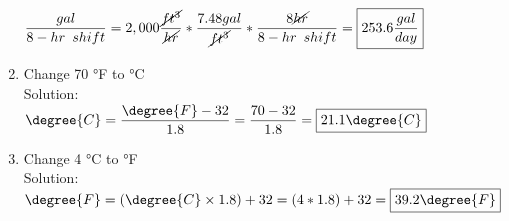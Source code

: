 \documentclass{article}
\begin{document}
\begin{enumerate}
$\dfrac{gal}{8-hr \enspace shift}=2,000\dfrac{\cancel{ft^3}}{\cancel{hr}}*\dfrac{7.48gal}{\cancel{ft^3}}*\dfrac{8\cancel{hr}}{8-hr \enspace shift}=\boxed{253.6 \dfrac{gal}{day}}$

\vspace{0.2cm}
\item Change 70 °F to °C\\
Solution:\\
\vspace{0.2cm}
$\degree{C} = \dfrac{\degree{F}-32}{1.8} = \dfrac{70-32}{1.8}=\boxed{21.1\degree{C}}$
\vspace{0.2cm}
\item Change 4 °C to °F\\
Solution:\\
\vspace{0.2cm}
$\degree{F}=(\degree{C} \times 1.8)+32 = (4*1.8)+32=\boxed{39.2\degree{F}}$
\end{enumerate}
\end{document}
